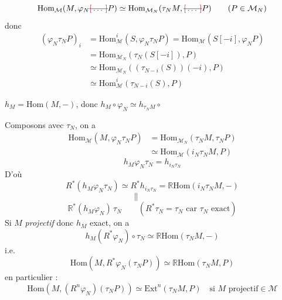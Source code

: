 \documentclass[11pt,a4paper]{article}
\begin{document}
\[
  \mathrm{Hom}_{\mathcal{M}}(M, \varphi_N \text{\struck{\ill{}}} P) \simeq \mathrm{Hom}_{\mathcal{M}_N}(\tau_N M, \text{\struck{\ill{}}} P)
  \qquad (P \in \mathcal{M}_N)
\]
donc
\begin{align*}
  (\varphi_N \tau_N P)_i
  &= \mathrm{Hom}^i_{\mathcal{M}}(S, \varphi_N \tau_N P) = \mathrm{Hom}_{\mathcal{M}}(S[-i], \varphi_N P) \\
  &= \mathrm{Hom}_{\mathcal{M}_N}(\tau_N(S[-i]), P) \\
  &\simeq \mathrm{Hom}_{\mathcal{M}_N}((\tau_{N-i}(S))(-i), P) \\
  &\simeq \mathrm{Hom}^i_{\mathcal{M}}(\tau_{N-i}(S), P)
\end{align*}

$h_M = \mathrm{Hom}(M, -)$, donc $h_M \circ \varphi_N \simeq h_{\tau_N M} \circ{}$ 



Composons avec $\tau_N$, on a
\begin{align*}
  \mathrm{Hom}_{\mathcal{M}}(M, \varphi_N \tau_N P) &= \mathrm{Hom}_{\mathcal{M}_N}(\tau_N M, \tau_N P) \\
  &\simeq \mathrm{Hom}_{\mathcal{M}}(i_N \tau_N M, P)
\end{align*}
\[
  h_M \varphi_N \tau_N = h_{i_N \tau_N}
\]
D'où
\[
  R^*(h_M \varphi_N \tau_N) \simeq R^* h_{i_N \tau_N} = \mathbb{R}\mathrm{Hom}(i_N \tau_N M, -)
\]
\[
  \| \qquad\qquad
\]
\[
  \mathbb{R}^*(h_M \varphi_N)\, \tau_N
  \qquad (R^* \tau_N = \tau_N \text{ car } \tau_N \text{ exact})
\]
Si $M$ \emph{projectif} donc $h_M$ exact, on a
\[
  h_M (R^* \varphi_N) \circ \tau_N \simeq \mathbb{R}\mathrm{Hom}(\tau_N M, -)
\]
i.e.
\[
  \boxed{\mathrm{Hom}(M, R^* \varphi_N(\tau_N P)) \simeq \mathbb{R}\mathrm{Hom}(\tau_N M, P)}
\]
en particulier :
\[
  \mathrm{Hom}(M, (R^n \varphi_N)(\tau_N P)) \simeq \mathrm{Ext}^n(\tau_N M, P)
  \quad \text{si } M \text{ projectif} \in \mathcal{M}
\]
\end{document}
